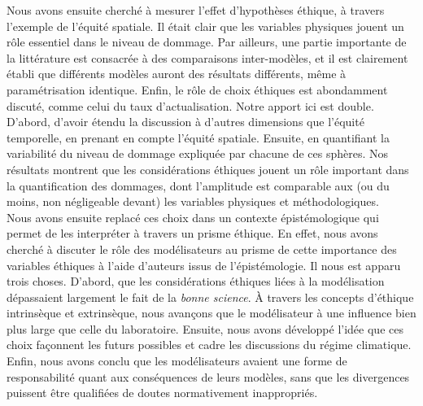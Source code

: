 Nous avons ensuite cherché à mesurer l'effet d'hypothèses éthique, à travers l'exemple de l'équité spatiale. Il était clair que les variables physiques jouent un rôle essentiel dans le niveau de dommage. Par ailleurs, une partie importante de la littérature est consacrée à des comparaisons inter-modèles, et il est clairement établi que différents modèles auront des résultats différents, même à paramétrisation identique. Enfin, le rôle de choix éthiques est abondamment discuté, comme celui du taux d'actualisation. Notre apport ici est double. D'abord, d'avoir étendu la discussion à d'autres dimensions que l'équité temporelle, en prenant en compte l'équité spatiale. Ensuite, en quantifiant la variabilité du niveau de dommage expliquée par chacune de ces sphères. Nos résultats montrent que les considérations éthiques jouent un rôle important dans la quantification des dommages, dont l'amplitude est comparable aux (ou du moins, non négligeable devant) les variables physiques et méthodologiques.   \\

Nous avons ensuite replacé ces choix dans un contexte épistémologique qui permet de les interpréter à travers un prisme éthique. En effet, nous avons cherché à discuter le rôle des modélisateurs au prisme de cette importance des variables éthiques à l'aide d'auteurs issus de l'épistémologie. Il nous est apparu trois choses. D'abord, que les considérations éthiques liées à la modélisation dépassaient largement le fait de la \emph{bonne science}. À travers les concepts d'éthique intrinsèque et extrinsèque, nous avançons que le modélisateur à une influence bien plus large que celle du laboratoire. Ensuite, nous avons développé l'idée que ces choix façonnent les futurs possibles et cadre les discussions du régime climatique. Enfin, nous avons conclu que les modélisateurs avaient une forme de responsabilité quant aux conséquences de leurs modèles, sans que les divergences puissent être qualifiées de doutes normativement inappropriés. \\

